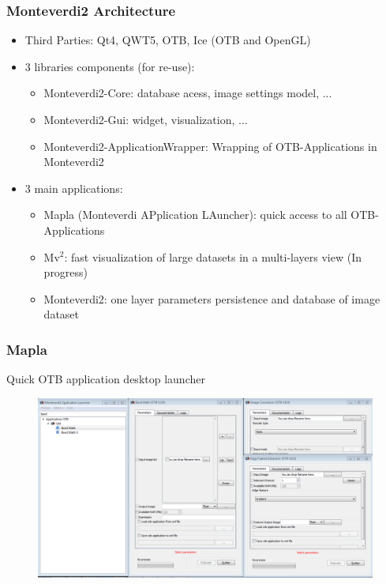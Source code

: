 \documentclass[8pt]{beamer}
\begin{document}
\begin{frame}
\frametitle{Monteverdi2 Architecture}
\begin{itemize}
    \item Third Parties: Qt4, QWT5, OTB, Ice (OTB and OpenGL)
    \item 3 libraries components (for re-use): 
        \begin{itemize}
            \item Monteverdi2-Core: database acess, image settings model, ...
            \item Monteverdi2-Gui: widget, visualization, ...
            \item Monteverdi2-ApplicationWrapper: Wrapping of OTB-Applications in Monteverdi2
        \end{itemize}
    \item 3 main applications:
        \begin{itemize}
            \item Mapla (Monteverdi APplication LAuncher): quick access to all OTB-Applications
            \item Mv$^{2}$: fast visualization of large datasets in a multi-layers view (In progress)
            \item Monteverdi2: one layer parameters persistence and database of image dataset
        \end{itemize}    
\end{itemize} 
\end{frame}

\begin{frame}
\frametitle{Mapla}
Quick OTB application desktop launcher
\begin{figure}[hbtp]
    \centering
    \includegraphics[scale=0.3]{images/Mapla.png} 
\end{figure}
\end{frame}
\end{document}
